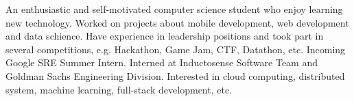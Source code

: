 

\begin{cvparagraph}

An enthusiastic and self-motivated computer science student who enjoy learning new technology. Worked on projects about mobile development, web development and data schience. Have experience in leadership positions and took part in several competitions, e.g. Hackathon, Game Jam, CTF, Datathon, etc. Incoming Google SRE Summer Intern. Interned at Inductosense Software Team and Goldman Sachs Engineering Division. Interested in cloud computing, distributed system, machine learning, full-stack development, etc.
\end{cvparagraph}
